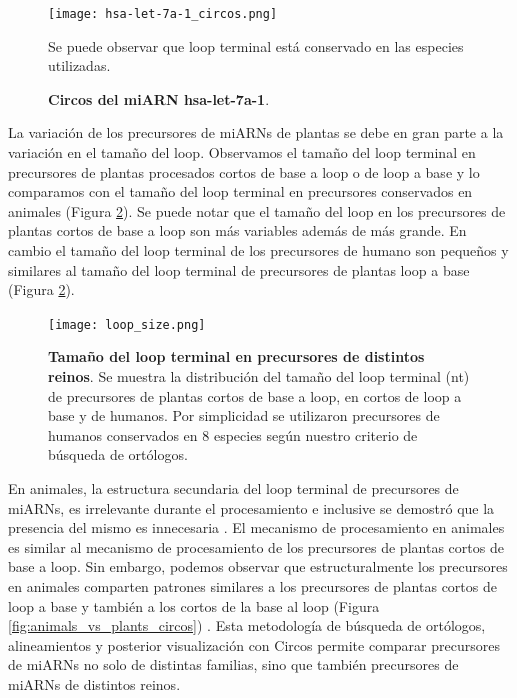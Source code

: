 \begin{figure}[htbp!] 
	\centering    
	\texttt{[image: hsa-let-7a-1\_circos.png]}
	\caption[Circos del miARN hsa-let-7a-1]{
		\textbf{Circos del miARN hsa-let-7a-1}.
	}
	\label{fig:hsa-let-7a-1_circos}
    Se puede observar que loop terminal está conservado en las especies utilizadas.
\end{figure}

La variación de los precursores de miARNs de plantas se debe en gran parte a la variación en el tamaño del loop.
Observamos el tamaño del loop terminal en precursores de plantas procesados cortos de base a loop o de loop a base y lo comparamos con el tamaño del loop terminal en precursores conservados en animales (Figura \ref{fig:loop_size}).
Se puede notar que el tamaño del loop en los precursores de plantas cortos de base a loop son más variables además de más grande.
En cambio el tamaño del loop terminal de los precursores de humano son pequeños y similares al tamaño del loop terminal de precursores de plantas loop a base (Figura \ref{fig:loop_size}).

\begin{figure}[htbp!] 
	\centering    
	\texttt{[image: loop\_size.png]}
	\caption[Tamaño del loop terminal en precursores de distintos reinos]{
		\textbf{Tamaño del loop terminal en precursores de distintos reinos}.
		Se muestra la distribución del tamaño del loop terminal (nt) de precursores de plantas cortos de base a loop, en cortos de loop a base y de humanos.
		Por simplicidad se utilizaron precursores de humanos conservados en 8 especies según nuestro criterio de búsqueda de ortólogos.
	}
	\label{fig:loop_size}
\end{figure}

En animales, la estructura secundaria del loop terminal de precursores de miARNs, es irrelevante durante el procesamiento e inclusive se demostró que la presencia del mismo es innecesaria \citep{pmid16751099}.
El mecanismo de procesamiento en animales es similar al mecanismo de procesamiento de los precursores de plantas cortos de base a loop.
Sin embargo, podemos observar que estructuralmente los precursores en animales comparten patrones similares a los precursores de plantas cortos de loop a base y también a los cortos de la base al loop (Figura \ref{fig:animals_vs_plants_circos}) .
Esta metodología de búsqueda de ortólogos, alineamientos y posterior visualización con Circos permite comparar precursores de miARNs no solo de distintas familias, sino que también precursores de miARNs de distintos reinos.

